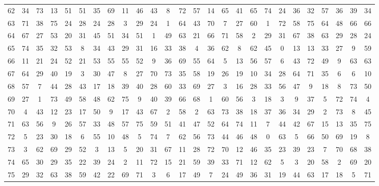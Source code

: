\begin{table}
\begin{tabular}{c c c c c c c c c c c c c c c c c c c c c c c c c c }
62 & 34 & 73 & 13 & 51 & 51 & 35 & 69 & 11 & 46 & 43 & 8 & 72 & 57 & 14 & 65 & 41 & 65 & 74 & 24 & 36 & 32 & 57 & 36 & 39 & 34 \\
63 & 71 & 38 & 75 & 24 & 28 & 24 & 28 & 3 & 29 & 24 & 1 & 64 & 43 & 70 & 7 & 27 & 60 & 1 & 72 & 58 & 75 & 64 & 48 & 66 & 66 \\
64 & 67 & 27 & 53 & 20 & 31 & 45 & 51 & 34 & 51 & 1 & 49 & 63 & 21 & 66 & 71 & 58 & 2 & 29 & 31 & 67 & 38 & 63 & 29 & 28 & 24 \\
65 & 74 & 35 & 32 & 53 & 8 & 34 & 43 & 29 & 31 & 16 & 33 & 38 & 4 & 36 & 62 & 8 & 62 & 45 & 0 & 13 & 13 & 33 & 27 & 9 & 59 \\
66 & 11 & 21 & 24 & 52 & 21 & 53 & 55 & 55 & 52 & 9 & 36 & 69 & 55 & 64 & 5 & 13 & 56 & 57 & 6 & 43 & 72 & 49 & 9 & 63 & 63 \\
67 & 64 & 29 & 40 & 19 & 3 & 30 & 47 & 8 & 27 & 70 & 73 & 35 & 58 & 19 & 26 & 19 & 10 & 34 & 28 & 64 & 71 & 35 & 6 & 6 & 10 \\
68 & 57 & 7 & 44 & 28 & 43 & 17 & 18 & 39 & 40 & 28 & 60 & 33 & 69 & 27 & 3 & 16 & 28 & 33 & 56 & 47 & 9 & 18 & 8 & 73 & 50 \\
69 & 27 & 1 & 73 & 49 & 58 & 48 & 62 & 75 & 9 & 40 & 39 & 66 & 68 & 1 & 60 & 56 & 3 & 18 & 3 & 9 & 37 & 5 & 72 & 74 & 4 \\
70 & 4 & 43 & 12 & 23 & 17 & 50 & 9 & 17 & 43 & 67 & 2 & 58 & 2 & 63 & 73 & 38 & 18 & 37 & 36 & 34 & 29 & 2 & 73 & 8 & 45 \\
71 & 63 & 56 & 9 & 26 & 57 & 33 & 48 & 57 & 75 & 59 & 51 & 41 & 47 & 52 & 64 & 74 & 11 & 7 & 44 & 42 & 67 & 15 & 13 & 35 & 75 \\
72 & 5 & 23 & 30 & 18 & 6 & 55 & 10 & 48 & 5 & 74 & 7 & 62 & 56 & 73 & 44 & 46 & 48 & 0 & 63 & 5 & 66 & 50 & 69 & 19 & 8 \\
73 & 3 & 62 & 69 & 29 & 52 & 3 & 13 & 5 & 20 & 31 & 67 & 11 & 28 & 72 & 70 & 12 & 46 & 35 & 23 & 39 & 23 & 7 & 70 & 68 & 38 \\
74 & 65 & 30 & 29 & 35 & 22 & 39 & 24 & 2 & 11 & 72 & 15 & 21 & 59 & 39 & 33 & 71 & 12 & 62 & 5 & 3 & 20 & 58 & 2 & 69 & 20 \\
75 & 29 & 32 & 63 & 38 & 59 & 42 & 22 & 69 & 71 & 3 & 6 & 17 & 49 & 7 & 24 & 49 & 36 & 31 & 19 & 44 & 63 & 17 & 18 & 5 & 71 \\
\hline
\end{tabular}
\end{table}